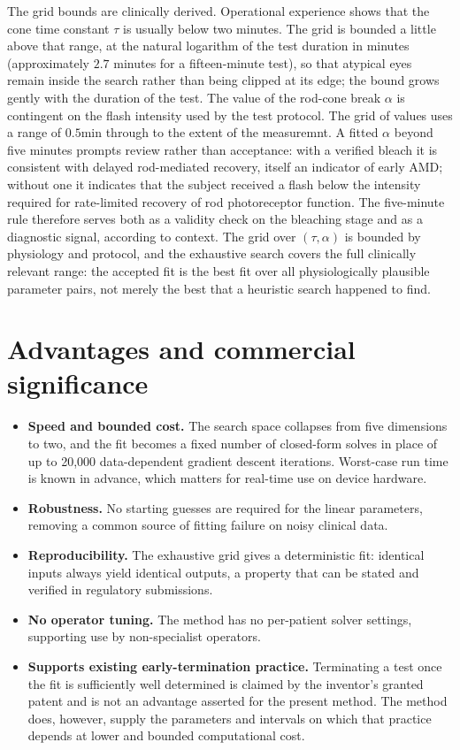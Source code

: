 \documentclass[11pt,a4paper]{article}
\begin{document}
The grid bounds are clinically derived. Operational experience shows that
the cone time constant $\tau$ is usually below two minutes. The grid is
bounded a little above that range, at the natural logarithm of the test
duration in minutes (approximately $2.7$ minutes for a fifteen-minute
test), so that atypical eyes remain inside the search rather than being
clipped at its edge; the bound grows gently with the duration of the
test. The value of the rod-cone break $\alpha$ is contingent on the flash intensity used by
the test protocol. The grid of values uses a range of $0.5$min through to the extent of the measuremnt. A fitted $\alpha$ beyond five minutes prompts review rather than acceptance: with a verified bleach it is consistent with
delayed rod-mediated recovery, itself an indicator of early AMD; without
one it indicates that the subject received a flash below the intensity
required for rate-limited recovery of rod photoreceptor function. The
five-minute rule therefore serves both as a validity check on the
bleaching stage and as a diagnostic signal, according to context. The grid over $(\tau,\alpha)$ is bounded by physiology
and protocol, and the exhaustive search covers the full clinically
relevant range: the accepted fit is the best fit over all physiologically
plausible parameter pairs, not merely the best that a heuristic search
happened to find.

\section{Advantages and commercial significance}
\begin{itemize}[nosep]
\item \textbf{Speed and bounded cost.} The search space collapses from
  five dimensions to two, and the fit becomes a fixed number of
  closed-form solves in place of up to 20{,}000 data-dependent gradient
  descent iterations. Worst-case run time is known in advance, which
  matters for real-time use on device hardware.
\item \textbf{Robustness.} No starting guesses are required for the
  linear parameters, removing a common source of fitting failure on noisy
  clinical data.
\item \textbf{Reproducibility.} The exhaustive grid gives a deterministic
  fit: identical inputs always yield identical outputs, a property that
  can be stated and verified in regulatory submissions.
\item \textbf{No operator tuning.} The method has no per-patient solver
  settings, supporting use by non-specialist operators.
\item \textbf{Supports existing early-termination practice.} Terminating
  a test once the fit is sufficiently well determined is claimed by the
  inventor's granted patent and is not an advantage asserted for the
  present method. The method does, however, supply the parameters and
  intervals on which that practice depends at lower and bounded
  computational cost.
\end{itemize}
\end{document}
